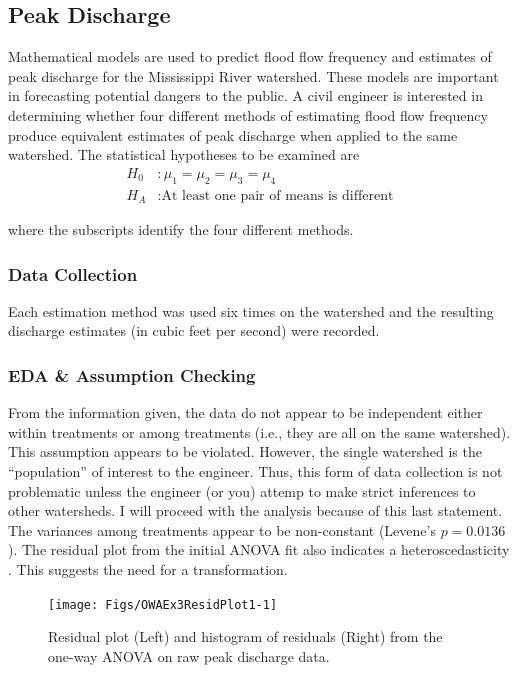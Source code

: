 \documentclass[10pt,openany]{book}\usepackage[]{graphicx}\usepackage[]{color}
\newenvironment{knitrout}{}{} %
\begin{document}
\subsection{Peak Discharge}

Mathematical models are used to predict flood flow frequency and estimates of peak discharge for the Mississippi River watershed.  These models are important in forecasting potential dangers to the public.  A civil engineer is interested in determining whether four different methods of estimating flood flow frequency produce equivalent estimates of peak discharge when applied to the same watershed.  The statistical hypotheses to be examined are
\[ \begin{split}
   H_{0}&: \mu_{1} = \mu_{2} = \mu_{3} = \mu_{4} \\
   H_{A}&:\text{At least one pair of means is different}
\end{split} \]

where the subscripts identify the four different methods.

\subsubsection*{Data Collection}
Each estimation method was used six times on the watershed and the resulting discharge estimates (in cubic feet per second) were recorded.

\subsubsection*{EDA \& Assumption Checking}

From the information given, the data do not appear to be independent either within treatments or among treatments (i.e., they are all on the same watershed).  This assumption appears to be violated.  However, the single watershed is the ``population'' of interest to the engineer.  Thus, this form of data collection is not problematic unless the engineer (or you) attemp to make strict inferences to other watersheds.  I will proceed with the analysis because of this last statement.  The variances among treatments appear to be non-constant (Levene's $p=0.0136$).  The residual plot from the initial ANOVA fit also indicates a heteroscedasticity .  This suggests the need for a transformation.

\begin{knitrout}
\color{fgcolor}\begin{figure}[hbtp]

{\centering \texttt{[image: Figs/OWAEx3ResidPlot1-1]} 

}

\caption[Residual plot (Left) and histogram of residuals (Right) from the one-way ANOVA on raw peak discharge data]{Residual plot (Left) and histogram of residuals (Right) from the one-way ANOVA on raw peak discharge data.}\label{fig:OWAEx3ResidPlot1}
\end{figure}


\end{knitrout}
\end{document}
